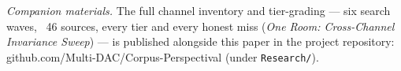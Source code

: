 \documentclass[11pt]{article}
\begin{document}
\emph{Companion materials.} The full channel inventory and tier-grading --- six search waves, ~46 sources, every tier and every honest miss (\emph{One Room: Cross-Channel Invariance Sweep}) --- is published alongside this paper in the project repository: github.com/Multi-DAC/Corpus-Perspectival (under \texttt{Research/}).
\end{document}
